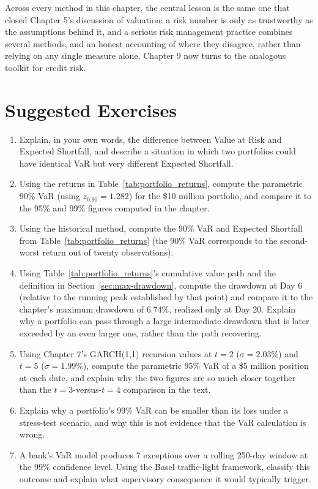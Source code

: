 \documentclass[../ai_in_finance]{subfiles}
\begin{document}
Across every method in this chapter, the central lesson is the same one that closed Chapter 5's discussion of valuation: a risk number is only as trustworthy as the assumptions behind it, and a serious risk management practice combines several methods, and an honest accounting of where they disagree, rather than relying on any single measure alone. Chapter 9 now turns to the analogous toolkit for credit risk.

\section{Suggested Exercises}

\begin{enumerate}
    \item Explain, in your own words, the difference between Value at Risk and Expected Shortfall, and describe a situation in which two portfolios could have identical VaR but very different Expected Shortfall.
    \item Using the returns in Table~\ref{tab:portfolio_returns}, compute the parametric 90\% VaR (using $z_{0.90}=1.282$) for the \$10 million portfolio, and compare it to the 95\% and 99\% figures computed in the chapter.
    \item Using the historical method, compute the 90\% VaR and Expected Shortfall from Table~\ref{tab:portfolio_returns} (the 90\% VaR corresponds to the second-worst return out of twenty observations).
    \item Using Table~\ref{tab:portfolio_returns}'s cumulative value path and the definition in Section~\ref{sec:max-drawdown}, compute the drawdown at Day 6 (relative to the running peak established by that point) and compare it to the chapter's maximum drawdown of $6.74\%$, realized only at Day 20. Explain why a portfolio can pass through a large intermediate drawdown that is later exceeded by an even larger one, rather than the path recovering.
    \item Using Chapter 7's GARCH(1,1) recursion values at $t=2$ ($\sigma=2.03\%$) and $t=5$ ($\sigma=1.99\%$), compute the parametric 95\% VaR of a \$5 million position at each date, and explain why the two figures are so much closer together than the $t=3$-versus-$t=4$ comparison in the text.
    \item Explain why a portfolio's 99\% VaR can be smaller than its loss under a stress-test scenario, and why this is not evidence that the VaR calculation is wrong.
    \item A bank's VaR model produces 7 exceptions over a rolling 250-day window at the 99\% confidence level. Using the Basel traffic-light framework, classify this outcome and explain what supervisory consequence it would typically trigger.

\end{enumerate}
\end{document}

